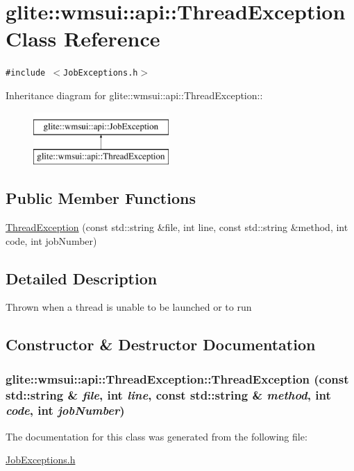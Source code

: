 \hypertarget{classglite_1_1wmsui_1_1api_1_1ThreadException}{
\section{glite::wmsui::api::Thread\-Exception Class Reference}
\label{classglite_1_1wmsui_1_1api_1_1ThreadException}
}
{\tt \#include $<$Job\-Exceptions.h$>$}

Inheritance diagram for glite::wmsui::api::Thread\-Exception::\begin{figure}[H]
\begin{center}
\leavevmode
\includegraphics[height=2cm]{classglite_1_1wmsui_1_1api_1_1ThreadException}
\end{center}
\end{figure}
\subsection*{Public Member Functions}
\begin{CompactItemize}
\item 
\hyperlink{classglite_1_1wmsui_1_1api_1_1ThreadException_a0}{Thread\-Exception} (const std::string \&file, int line, const std::string \&method, int code, int job\-Number)
\end{CompactItemize}


\subsection{Detailed Description}
Thrown when a thread is unable to be launched or to run 



\subsection{Constructor \& Destructor Documentation}
\hypertarget{classglite_1_1wmsui_1_1api_1_1ThreadException_a0}{
\subsubsection[ThreadException]{\setlength{\rightskip}{0pt plus 5cm}glite::wmsui::api::Thread\-Exception::Thread\-Exception (const std::string \& {\em file}, int {\em line}, const std::string \& {\em method}, int {\em code}, int {\em job\-Number})}}
\label{classglite_1_1wmsui_1_1api_1_1ThreadException_a0}




The documentation for this class was generated from the following file:\begin{CompactItemize}
\item 
\hyperlink{JobExceptions_8h}{Job\-Exceptions.h}\end{CompactItemize}
